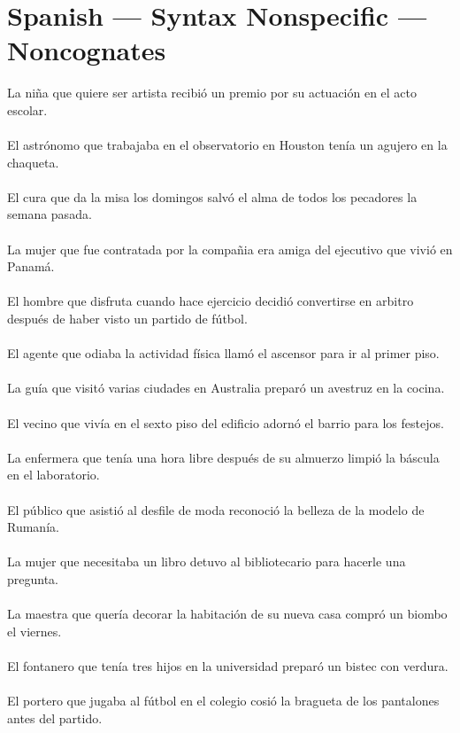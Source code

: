 \section{Spanish --- Syntax Nonspecific --- Noncognates}
La niña que quiere ser artista recibió un premio por su actuación en el acto escolar.	\\	\\
El astrónomo que trabajaba en el observatorio en Houston tenía un agujero en la chaqueta.	\\	\\
El cura que da la misa los domingos salvó el alma de todos los pecadores la semana pasada.	\\	\\
La mujer que fue contratada por la compañia era amiga del ejecutivo que vivió en Panamá.	\\	\\
El hombre que disfruta cuando hace ejercicio decidió convertirse en arbitro después de haber visto un partido de fútbol.	\\	\\
El agente que odiaba la actividad física llamó el ascensor para ir al primer piso.	\\	\\
La guía que visitó varias ciudades en Australia preparó un avestruz en la cocina.	\\	\\
El vecino que vivía en el sexto piso del edificio adornó el barrio para los festejos.	\\	\\
La enfermera que tenía una hora libre después de su almuerzo limpió la báscula en el laboratorio.	\\	\\
El público que asistió al desfile de moda reconoció la belleza de la modelo de Rumanía.	\\	\\
La mujer que necesitaba un libro detuvo al bibliotecario para hacerle una pregunta.	\\	\\
La maestra que quería decorar la habitación de su nueva casa compró un biombo el viernes.	\\	\\
El fontanero que tenía tres hijos en la universidad preparó un bistec con verdura.	\\	\\
El portero que jugaba al fútbol en el colegio cosió la bragueta de los pantalones antes del partido.	\\	\\
